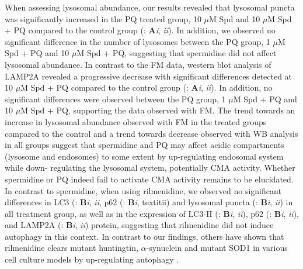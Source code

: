 When assessing lysosomal abundance, our results revealed that lysosomal puncta was significantly increased in the PQ treated group, 10 $\mu$M Spd and 10 $\mu$M Spd + PQ compared to the control group (: \textbf{A}\textit{i}, \textit{ii}). In addition, we observed no significant difference in the number of lysosomes between the PQ group, 1 $\mu$M Spd + PQ and 10 $\mu$M Spd + PQ, suggesting that spermidine did not affect  lysosomal abundance. In contrast to the FM data, western blot analysis of LAMP2A revealed a progressive decrease with significant differences detected at 10 $\mu$M Spd + PQ compared to the control group (: \textbf{A}\textit{i}, \textit{ii}). In addition, no significant differences were observed between the PQ group, 1 $\mu$M Spd + PQ and 10 $\mu$M Spd + PQ, supporting the data observed with FM. The trend towards an increase in lysosomal abundance observed with FM in the treated groups compared to the control and a trend towards decrease observed with WB analysis in all groups suggest that spermidine and PQ may affect acidic compartments (lysosome and endosomes) to some extent by up-regulating endosomal system while down- regulating the lysosomal system, potentially CMA activity.  Whether spermidine or PQ indeed fail to activate CMA activity remains to be elucidated. In contrast to spermidine, when using rilmenidine, we observed no significant differences in LC3 (: \textbf{B}\textit{i}, \textit{ii}, p62 (: \textbf{B}\textit{i}, textit{ii}) and lysosomal puncta (: \textbf{B}\textit{i}, \textit{ii}) in all treatment group, as well as in the expression of LC3-II (: \textbf{B}\textit{i}, \textit{ii}), p62 (: \textbf{B}\textit{i}, \textit{ii}), and LAMP2A  (: \textbf{B}\textit{i}, \textit{ii}) protein, suggesting that rilmenidine did not induce autophagy in this context. In contrast to our findings, others have shown that rilmenidine clears mutant huntingtin, $\alpha$-synuclein and mutant SOD1 in various cell culture models by up-regulating autophagy \citep{Rose2010,Perera2018,Williams2008}. 

